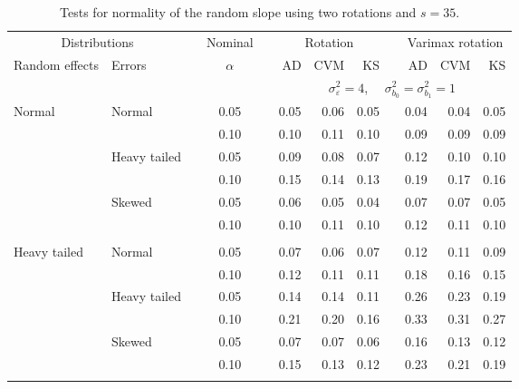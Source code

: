 \begin{table}[ht]
\caption{\label{tab:simb135}Tests for normality of the random slope using two rotations and $s = 35$.}
\begin{scriptsize}
\begin{center}
\begin{tabular}{ll p{.1cm} c p{.1cm} rrr p{.1cm} rrr}
  \hline
  \multicolumn{2}{c}{Distributions}& & Nominal & &  \multicolumn{3}{c}{Rotation} & & \multicolumn{3}{c}{Varimax rotation} \\ \cline{1-2} \cline{6-8} \cline{10-12}   
  Random effects & Errors & & $\alpha$ & & AD & CVM & KS & & AD & CVM & KS \\ 
   \hline
& && && \multicolumn{7}{c}{$\sigma_{\varepsilon}^2 = 4$, \ \ $\sigma_{b_0}^2 = \sigma_{b_1}^2 = 1$} \\ \cline{6-12}
\rowcolor{gray!20}Normal       & Normal       && 0.05 &&  0.05 & 0.06 & 0.05 && 0.04 & 0.04 & 0.05 \\ 
\rowcolor{gray!20}             &              && 0.10 &&  0.10 & 0.11 & 0.10 && 0.09 & 0.09 & 0.09 \\ 
\rowcolor{gray!20}             & Heavy tailed && 0.05 &&  0.09 & 0.08 & 0.07 && 0.12 & 0.10 & 0.10 \\ 
\rowcolor{gray!20}             &              && 0.10 &&  0.15 & 0.14 & 0.13 && 0.19 & 0.17 & 0.16 \\ 
\rowcolor{gray!20}             & Skewed       && 0.05 &&  0.06 & 0.05 & 0.04 && 0.07 & 0.07 & 0.05 \\ 
\rowcolor{gray!20}             &              && 0.10 &&  0.10 & 0.11 & 0.10 && 0.12 & 0.11 & 0.10 \\ 
             &&&&&&&&&&&\\
Heavy tailed & Normal       && 0.05 &&  0.07 & 0.06 & 0.07 && 0.12 & 0.11 & 0.09 \\ 
             &              && 0.10 &&  0.12 & 0.11 & 0.11 && 0.18 & 0.16 & 0.15 \\ 
             & Heavy tailed && 0.05 &&  0.14 & 0.14 & 0.11 && 0.26 & 0.23 & 0.19 \\ 
             &              && 0.10 &&  0.21 & 0.20 & 0.16 && 0.33 & 0.31 & 0.27 \\ 
             & Skewed       && 0.05 &&  0.07 & 0.07 & 0.06 && 0.16 & 0.13 & 0.12 \\ 
             &              && 0.10 &&  0.15 & 0.13 & 0.12 && 0.23 & 0.21 & 0.19 \\ 
             &&&&&&&&&&&\\

\end{tabular}
\end{center}
\end{scriptsize}
\end{table}
